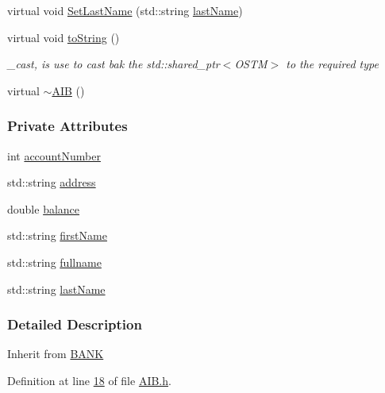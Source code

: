 \begin{DoxyCompactItemize}
\item 
virtual void \hyperlink{class_a_i_b_afe4e3c7b481bf87437968dde2cc75882_afe4e3c7b481bf87437968dde2cc75882}{Set\+Last\+Name} (std\+::string \hyperlink{class_a_i_b_ace7b8b648d1b44b7ee2f4be002952b7a_ace7b8b648d1b44b7ee2f4be002952b7a}{last\+Name})
\item 
virtual void \hyperlink{class_a_i_b_aff0f0a0db75a17efec4bd500b888232d_aff0f0a0db75a17efec4bd500b888232d}{to\+String} ()
\begin{DoxyCompactList}\small\item\em \+\_\+cast, is use to cast bak the std\+::shared\+\_\+ptr$<$\+O\+S\+T\+M$>$ to the required type \end{DoxyCompactList}\item 
virtual \hyperlink{class_a_i_b_a22b11c50b0986326c86315957528bf79_a22b11c50b0986326c86315957528bf79}{$\sim$\+A\+IB} ()
\end{DoxyCompactItemize}
\subsubsection*{Private Attributes}
\begin{DoxyCompactItemize}
\item 
int \hyperlink{class_a_i_b_aafc08efeec5b8c800c32ee32f20603a7_aafc08efeec5b8c800c32ee32f20603a7}{account\+Number}
\item 
std\+::string \hyperlink{class_a_i_b_ae6a67cc33d1e5fa83a52a238e45ca3dc_ae6a67cc33d1e5fa83a52a238e45ca3dc}{address}
\item 
double \hyperlink{class_a_i_b_a3c8d637bd997c1f062d844a88e2559ba_a3c8d637bd997c1f062d844a88e2559ba}{balance}
\item 
std\+::string \hyperlink{class_a_i_b_a869f72057cb63ebf0cfd257069e15c7c_a869f72057cb63ebf0cfd257069e15c7c}{first\+Name}
\item 
std\+::string \hyperlink{class_a_i_b_a818b0cc283af23127c067fb3fc751058_a818b0cc283af23127c067fb3fc751058}{fullname}
\item 
std\+::string \hyperlink{class_a_i_b_ace7b8b648d1b44b7ee2f4be002952b7a_ace7b8b648d1b44b7ee2f4be002952b7a}{last\+Name}
\end{DoxyCompactItemize}


\subsubsection{Detailed Description}
Inherit from \hyperlink{class_b_a_n_k}{B\+A\+NK} 

Definition at line \hyperlink{_a_i_b_8h_source_l00018}{18} of file \hyperlink{_a_i_b_8h_source}{A\+I\+B.\+h}.



